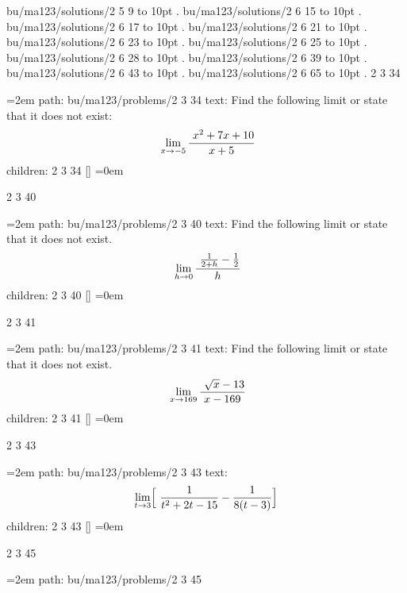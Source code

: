 bu/ma123/solutions/2 5 9 \leaders\hbox to 10pt {\hss.\hss}  \hfill {}
\smallskip
bu/ma123/solutions/2 6 15 \leaders\hbox to 10pt {\hss.\hss}  \hfill {}
\smallskip
bu/ma123/solutions/2 6 17 \leaders\hbox to 10pt {\hss.\hss}  \hfill {}
\smallskip
bu/ma123/solutions/2 6 21 \leaders\hbox to 10pt {\hss.\hss}  \hfill {}
\smallskip
bu/ma123/solutions/2 6 23 \leaders\hbox to 10pt {\hss.\hss}  \hfill {}
\smallskip
bu/ma123/solutions/2 6 25 \leaders\hbox to 10pt {\hss.\hss}  \hfill {}
\smallskip
bu/ma123/solutions/2 6 28 \leaders\hbox to 10pt {\hss.\hss}  \hfill {}
\smallskip
bu/ma123/solutions/2 6 39 \leaders\hbox to 10pt {\hss.\hss}  \hfill {}
\smallskip
bu/ma123/solutions/2 6 43 \leaders\hbox to 10pt {\hss.\hss}  \hfill {}
\smallskip
bu/ma123/solutions/2 6 65 \leaders\hbox to 10pt {\hss.\hss}  \hfill {}
\smallskip
\vfill \break
{}
2 3 34
\smallskip
\par\begingroup
\leftskip=2em
path: bu/ma123/problems/2 3 34
\smallskip
text:  Find the following limit or state that it does not exist: $$\ \lim_{x \to -5} {\ {x^2 + 7x + 10} \over {x + 5} } $$
\smallskip
children: 2 3 34 []
\smallskip
\leftskip=0em
\par\endgroup
\bigskip
{}
2 3 40
\smallskip
\par\begingroup
\leftskip=2em
path: bu/ma123/problems/2 3 40
\smallskip
text:  Find the following limit or state that it does not exist. $$\ \lim_{h \to 0} {\ {{1 \over 2 + h} - {1 \over 2}} \over h } $$
\smallskip
children: 2 3 40 []
\smallskip
\leftskip=0em
\par\endgroup
\bigskip
{}
2 3 41
\smallskip
\par\begingroup
\leftskip=2em
path: bu/ma123/problems/2 3 41
\smallskip
text:  Find the following limit or state that it does not exist. $$\ \lim_{x \to 169} {\ {\sqrt{x} - 13} \over {x - 169} } $$
\smallskip
children: 2 3 41 []
\smallskip
\leftskip=0em
\par\endgroup
\bigskip
{}
2 3 43
\smallskip
\par\begingroup
\leftskip=2em
path: bu/ma123/problems/2 3 43
\smallskip
text:  $$\lim_{t \to 3} \Bigl[ {\ {1 \over t^2 + 2t - 15} - {1 \over 8(t - 3)} }\Bigr] $$
\smallskip
children: 2 3 43 []
\smallskip
\leftskip=0em
\par\endgroup
\bigskip
{}
2 3 45
\smallskip
\par\begingroup
\leftskip=2em
path: bu/ma123/problems/2 3 45
\smallskip
